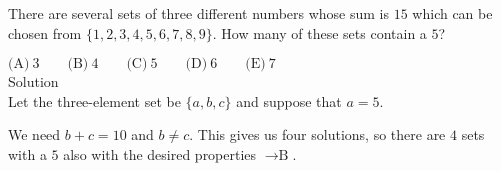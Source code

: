 

There are several sets of three different numbers whose sum is $15$ which can be chosen from $\{ 1,2,3,4,5,6,7,8,9 \}$. How many of these sets contain a $5$?

$\text{(A)}\ 3 \qquad \text{(B)}\ 4 \qquad \text{(C)}\ 5 \qquad \text{(D)}\ 6 \qquad \text{(E)}\ 7$
\\
Solution
\\
Let the three-element set be $\{ a,b,c \}$ and suppose that $a=5$.

We need $b+c=10$ and $b\neq c$. This gives us four solutions, so there are $4$ sets with a $5$ also with the desired properties $\rightarrow \boxed{\text{B}}$.

